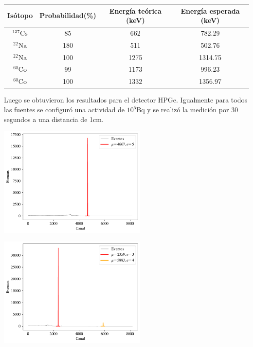 \documentclass[a4paper, onecolumn]{article}
\begin{document}
		\begin{center}
			{\renewcommand{\arraystretch}{1.5}
			\renewcommand{\tabcolsep}{0.2cm}
			\begin{tabular}{ c c c c }
				\hline
				Isótopo & Probabilidad(\%) & Energía teórica (keV) & Energía esperada (keV) \\
				\hline
				${}^{137}\mathrm{Cs}$ & 85 & 662 & 782.29\\ 
				${}^{22}\mathrm{Na}$ & 180 & 511 & 502.76\\ 
				${}^{22}\mathrm{Na}$ & 100 & 1275 & 1314.75 \\ 
				${}^{60}\mathrm{Co}$ & 99 & 1173 & 996.23 \\ 
				${}^{60}\mathrm{Co}$ & 100 & 1332 & 1356.97
			\end{tabular}}
		\end{center}

		Luego se obtuvieron los resultados para el detector HPGe. Igualmente para todos las fuentes se configuró una actividad de $10^5$Bq y se realizó la medición por 30 segundos a una distancia de 1cm.

		\begin{center}
			\includegraphics[width=210pt]{img/hpge_cs_137.pdf}
		\end{center}

		\begin{center}
			\includegraphics[width=210pt]{img/hpge_na_22.pdf}
		\end{center}
\end{document}
